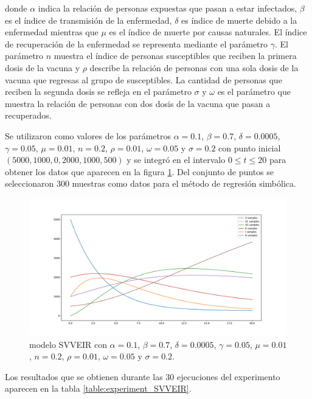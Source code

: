 donde $\alpha$ indica la relación de personas expuestas que pasan a estar infectados, $\beta$ es el índice de transmisión de la enfermedad, $\delta$ es índice de muerte debido a la enfermedad mientras que $\mu$ es el índice de muerte por causas naturales. El índice de recuperación de la enfermedad se representa mediante el parámetro $\gamma$. El parámetro $n$ muestra el índice de personas susceptibles que reciben la primera dosis de la vacuna y $\rho$ describe la relación de personas con una sola dosis de la vacuna que regresas al grupo de susceptibles. La cantidad de personas que reciben la segunda dosis se refleja en el parámetro $\sigma$ y $\omega$ es el parámetro que muestra la relación de personas con dos dosis de la vacuna que pasan a recuperados.

Se utilizaron como valores de los parámetros $\alpha = 0.1$, $\beta = 0.7$, $\delta = 0.0005$, $\gamma = 0.05$, $\mu = 0.01$, $n = 0.2$, $\rho = 0.01$, $\omega = 0.05$ y $\sigma = 0.2$ con punto inicial $(5000, 1000, 0, 2000, 1000, 500)$ y se integró en el intervalo $0 \leq t \leq 20$ para obtener los datos que aparecen en la figura \ref{fig:SVVEIR}. Del conjunto de puntos se seleccionaron 300 muestras como datos para el método de regresión simbólica.

\begin{figure}[h]
    \centering
    \includegraphics[width=\textwidth]{"figures/SVVEIR.pdf"}
    \caption{modelo SVVEIR con $\alpha = 0.1$, $\beta = 0.7$, $\delta = 0.0005$, $\gamma = 0.05$, $\mu = 0.01$, $n = 0.2$, $\rho = 0.01$, $\omega = 0.05$ y $\sigma = 0.2$.}
    \label{fig:SVVEIR}
\end{figure}

Los resultados que se obtienen durante las 30 ejecuciones del experimento aparecen en la tabla \ref{table:experiment_SVVEIR}.

